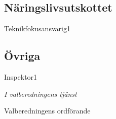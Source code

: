\documentclass[../_main/handlingar.tex]{subfiles}
\begin{document}

\subsection*{Näringslivsutskottet}
\begin{vallista}
    \begin{post}{Teknikfokusansvarig}{1}
        \vakant
    \end{post}
\end{vallista}

\subsection*{Övriga}
\begin{vallista}
    \begin{post}{Inspektor}{1}
    \end{post}
\end{vallista}

\begin{signatures}{1}
\emph{I valberedningens tjänst}
\signature{Pontus Landgren}{Valberedningens ordförande}
\end{signatures}
\end{document}
